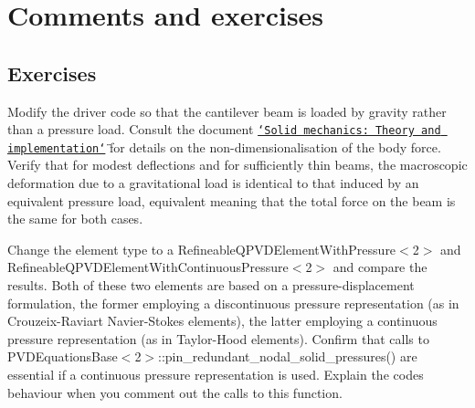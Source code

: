  

\hypertarget{index_exercises}{}\section{Comments and exercises}\label{index_exercises}
\hypertarget{index_ex}{}\subsection{Exercises}\label{index_ex}

\begin{DoxyEnumerate}
\item Modify the driver code so that the cantilever beam is loaded by gravity rather than a pressure load. Consult the document \href{../../solid_theory/html/index.html}{\tt \char`\"{}\+Solid mechanics\+: Theory and implementation\char`\"{}} for details on the non-\/dimensionalisation of the body force. Verify that for modest deflections and for sufficiently thin beams, the macroscopic deformation due to a gravitational load is identical to that induced by an equivalent pressure load, equivalent meaning that the total force on the beam is the same for both cases. ~\newline
 ~\newline

\item Change the element type to a {\ttfamily Refineable\+Q\+P\+V\+D\+Element\+With\+Pressure$<$2$>$} and {\ttfamily Refineable\+Q\+P\+V\+D\+Element\+With\+Continuous\+Pressure$<$2$>$} and compare the results. Both of these two elements are based on a pressure-\/displacement formulation, the former employing a discontinuous pressure representation (as in Crouzeix-\/\+Raviart Navier-\/\+Stokes elements), the latter employing a continuous pressure representation (as in Taylor-\/\+Hood elements). Confirm that calls to {\ttfamily P\+V\+D\+Equations\+Base$<$2$>$\+::pin\+\_\+redundant\+\_\+nodal\+\_\+solid\+\_\+pressures()} are essential if a continuous pressure representation is used. Explain the code\textquotesingle{}s behaviour when you comment out the calls to this function. ~\newline
 ~\newline


\end{DoxyEnumerate}

